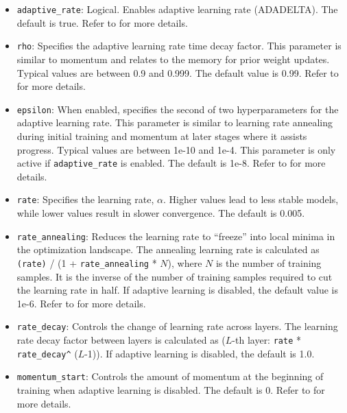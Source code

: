 {{{\begin{itemize}
\item \texttt{adaptive\_rate}: Logical.  Enables adaptive learning rate (ADADELTA). The default is true. Refer to {\textbf{}} for more details.

\item \texttt{rho}: Specifies the adaptive learning rate time decay factor. This parameter is similar to momentum and relates to the memory for prior weight updates. Typical values are between 0.9 and 0.999. The default value is 0.99. %
Refer to {\textbf{}} for more details. 

\item \texttt{epsilon}: When enabled, specifies the second of two hyperparameters for the adaptive learning rate. This parameter is similar to learning rate annealing during initial training and momentum at later stages where it assists progress. Typical values are between 1e-10 and 1e-4. This parameter is only active if \texttt{adaptive\_rate} is enabled. The default is 1e-8. %
Refer to {\textbf{}} for more details.

\item \texttt{rate}: Specifies the learning rate, $\alpha$. Higher values lead to less stable models, while lower values result in slower convergence. The default is 0.005.  %

\item \texttt{rate\_annealing}: Reduces the learning rate to ``freeze'' into local minima in the optimization landscape. The annealing learning rate is calculated as \texttt{(rate)} / (1 + \texttt{rate\_annealing} * $N$), where $N$ is the number of training samples.  It is the inverse of the number of training samples required to cut the learning rate in half.  If adaptive learning is disabled, the default value is 1e-6. Refer to {\textbf{}} for more details.

\item \texttt{rate\_decay}:  Controls the change of learning rate across layers. The learning rate decay factor between layers is calculated as ($L$-th layer: \texttt{rate} * \texttt{rate\_decay\^} ($L$-1)). If adaptive learning is disabled, the default is 1.0. 

\item \texttt{momentum\_start}: Controls the amount of momentum at the beginning of training when adaptive learning is disabled. The default is 0. Refer to {\textbf{}} for more details.


\end{itemize}}}}
